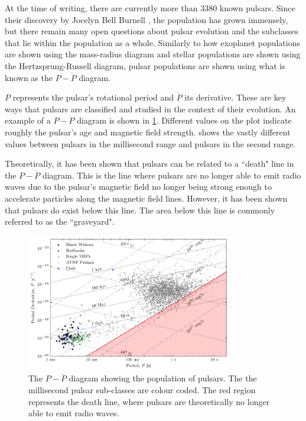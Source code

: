 At the time of writing, there are currently more than 3380 known pulsars. Since their discovery by Jocelyn Bell Burnell \citep{hewish_observation_1968}, the population has grown immensely, but there remain many open questions about pulsar evolution and the subclasses that lie within the population as a whole. Similarly to how exoplanet populations are shown using the mass-radius diagram and stellar populations are shown using the Hertzsprung-Russell diagram, pulsar populations are shown using what is known as the $P-\dot P$ diagram.

$P$ represents the pulsar's rotational period and $\dot P$ its derivative. These are key ways that pulsars are classified and studied in the context of their evolution. An example of a $P-\dot P$ diagram is shown in \cref{fig:p-pdot}. Different values on the plot indicate roughly the pulsar's age and magnetic field strength.  shows the vastly different values between pulsars in the millisecond range and pulsars in the second range.

Theoretically, it has been shown that pulsars can be related to a ``death" line in the $P-\dot P$ diagram. This is the line where pulsars are no longer able to emit radio waves due to the pulsar's magnetic field no longer being strong enough to accelerate particles along the magnetic field lines. However, it has been shown that pulsars do exist below this line. The area below this line is commonly referred to as the ``graveyard".
\begin{figure}
    \centering
    \includegraphics[width=0.8\textwidth]{figs/PPdot-diagram.pdf}
    \caption{The $P-\dot P$ diagram showing the population of pulsars. The the millisecond pulsar sub-classes are colour coded. The red region represents the death line, where pulsars are theoretically no longer able to emit radio waves.}
    \label{fig:p-pdot}
\end{figure}

